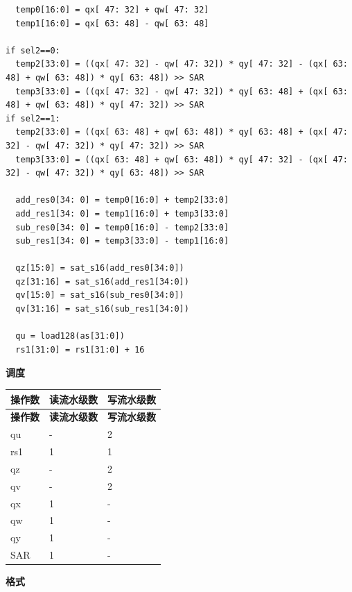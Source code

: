 \begin{lstlisting}
  temp0[16:0] = qx[ 47: 32] + qw[ 47: 32]
  temp1[16:0] = qx[ 63: 48] - qw[ 63: 48]

if sel2==0:
  temp2[33:0] = ((qx[ 47: 32] - qw[ 47: 32]) * qy[ 47: 32] - (qx[ 63: 48] + qw[ 63: 48]) * qy[ 63: 48]) >> SAR
  temp3[33:0] = ((qx[ 47: 32] - qw[ 47: 32]) * qy[ 63: 48] + (qx[ 63: 48] + qw[ 63: 48]) * qy[ 47: 32]) >> SAR
if sel2==1:
  temp2[33:0] = ((qx[ 63: 48] + qw[ 63: 48]) * qy[ 63: 48] + (qx[ 47: 32] - qw[ 47: 32]) * qy[ 47: 32]) >> SAR
  temp3[33:0] = ((qx[ 63: 48] + qw[ 63: 48]) * qy[ 47: 32] - (qx[ 47: 32] - qw[ 47: 32]) * qy[ 63: 48]) >> SAR

  add_res0[34: 0] = temp0[16:0] + temp2[33:0]
  add_res1[34: 0] = temp1[16:0] + temp3[33:0]
  sub_res0[34: 0] = temp0[16:0] - temp2[33:0]
  sub_res1[34: 0] = temp3[33:0] - temp1[16:0]

  qz[15:0] = sat_s16(add_res0[34:0])
  qz[31:16] = sat_s16(add_res1[34:0])
  qv[15:0] = sat_s16(sub_res0[34:0])
  qv[31:16] = sat_s16(sub_res1[34:0])

  qu = load128(as[31:0])
  rs1[31:0] = rs1[31:0] + 16
\end{lstlisting}

\textbf{调度}\\
\begin{longtable}[c]{|l|l|l|}
    \hline
    \rowcolor{lightgray}
    \textbf{操作数} & \textbf{读流水级数} & \textbf{写流水级数} \\\hline
    \endfirsthead
    \hline
    \rowcolor{lightgray}
     \textbf{操作数} & \textbf{读流水级数} & \textbf{写流水级数} \\\hline
    \endhead
    \hline
    \endfoot

  qu & - & 2 \\\hline
  rs1 & 1 & 1 \\\hline
  qz & - & 2 \\\hline
  qv & - & 2 \\\hline
  qx & 1 & - \\\hline
  qw & 1 & - \\\hline
  qy & 1 & - \\\hline
  SAR & 1 & -

\end{longtable}

\textbf{格式}\\

